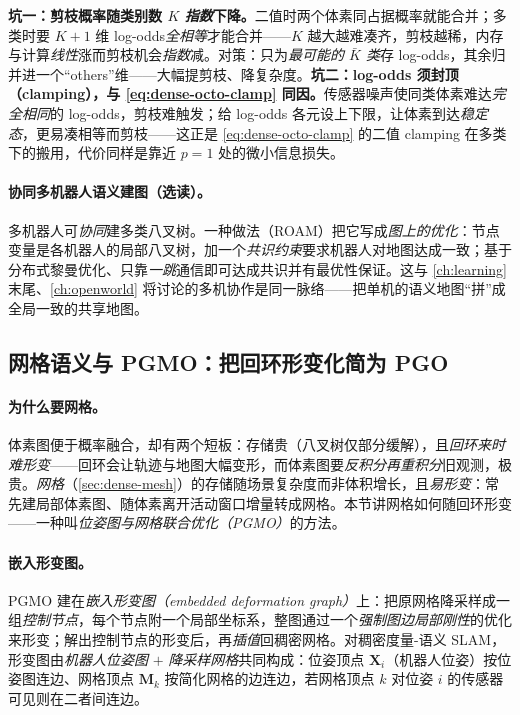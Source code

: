 \begin{pitfall}
\textbf{坑一：剪枝概率随类别数 $K$ \emph{指数}下降。}二值时两个体素同占据概率就能合并；多类时要 $K{+}1$ 维 log-odds\emph{全相等}才能合并——$K$ 越大越难凑齐，剪枝越稀，内存与计算\emph{线性}涨而剪枝机会\emph{指数}减\cite{asgharivaskasi2023semantic}。对策：只为\emph{最可能的 $\bar K$ 类}存 log-odds，其余归并进一个“others”维——大幅提剪枝、降复杂度。\textbf{坑二：log-odds 须封顶（clamping），与 \cref{eq:dense-octo-clamp} 同因。}传感器噪声使同类体素难达\emph{完全相同}的 log-odds，剪枝难触发；给 log-odds 各元设上下限，让体素到达\emph{稳定态}，更易凑相等而剪枝——这正是 \cref{eq:dense-octo-clamp} 的二值 clamping 在多类下的搬用，代价同样是靠近 $p{=}1$ 处的微小信息损失。
\end{pitfall}

\paragraph{协同多机器人语义建图（选读）。}
多机器人可\emph{协同}建多类八叉树。一种做法（ROAM\cite{asgharivaskasi2023roam}）把它写成\emph{图上的优化}：节点变量是各机器人的局部八叉树，加一个\emph{共识约束}要求机器人对地图达成一致；基于分布式黎曼优化、只靠\emph{一跳}通信即可达成共识并有最优性保证。这与 \cref{ch:learning} 末尾、\cref{ch:openworld} 将讨论的多机协作是同一脉络——把单机的语义地图“拼”成全局一致的共享地图。

\subsection{网格语义与 PGMO：把回环形变化简为 PGO}
\label{sec:semantic-dense-mesh}

\paragraph{为什么要网格。}
体素图便于概率融合，却有两个短板\cite{rosinol2021kimera}：存储贵（八叉树仅部分缓解），且\emph{回环来时难形变}——回环会让轨迹与地图大幅变形，而体素图要\emph{反积分再重积分}旧观测，极贵。\emph{网格}（\cref{sec:dense-mesh}）的存储随场景复杂度而非体积增长，且\emph{易形变}：常先建局部体素图、随体素离开活动窗口增量转成网格\cite{rosinol2021kimera}。本节讲网格如何随回环形变——一种叫\emph{位姿图与网格联合优化（PGMO）}的方法\cite{rosinol2021kimera}。

\paragraph{嵌入形变图。}
PGMO 建在\emph{嵌入形变图（embedded deformation graph）}上\cite{sumner2007embedded}：把原网格降采样成一组\emph{控制节点}，每个节点附一个局部坐标系，整图通过一个\emph{强制图边局部刚性}的优化来形变；解出控制节点的形变后，再\emph{插值}回稠密网格。对稠密度量-语义 SLAM，形变图由\emph{机器人位姿图} $+$ \emph{降采样网格}共同构成：位姿顶点 $\mathbf{X}_i$（机器人位姿）按位姿图连边、网格顶点 $\mathbf{M}_k$ 按简化网格的边连边，若网格顶点 $k$ 对位姿 $i$ 的传感器可见则在二者间连边。

